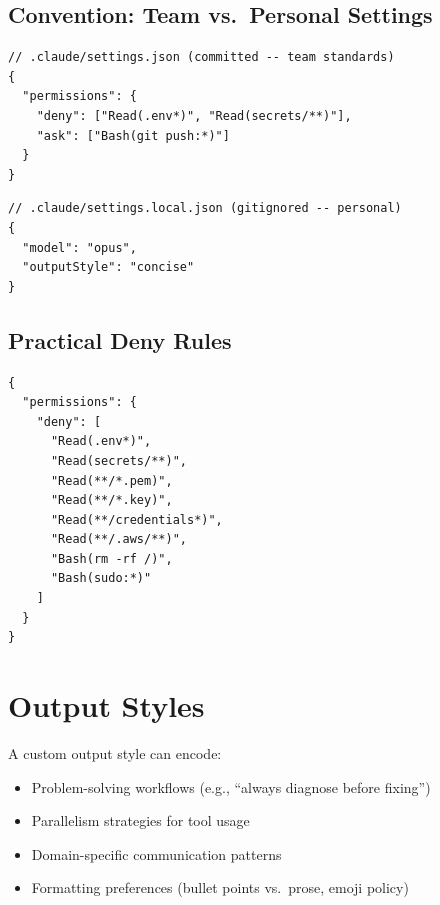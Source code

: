 \subsection{Convention: Team vs.\ Personal Settings}


\begin{verbatim}
// .claude/settings.json (committed -- team standards)
{
  "permissions": {
    "deny": ["Read(.env*)", "Read(secrets/**)"],
    "ask": ["Bash(git push:*)"]
  }
}
\end{verbatim}

\begin{verbatim}
// .claude/settings.local.json (gitignored -- personal)
{
  "model": "opus",
  "outputStyle": "concise"
}
\end{verbatim}

\subsection{Practical Deny Rules}


\begin{verbatim}
{
  "permissions": {
    "deny": [
      "Read(.env*)",
      "Read(secrets/**)",
      "Read(**/*.pem)",
      "Read(**/*.key)",
      "Read(**/credentials*)",
      "Read(**/.aws/**)",
      "Bash(rm -rf /)",
      "Bash(sudo:*)"
    ]
  }
}
\end{verbatim}

\section{Output Styles}
\label{sec:output-styles}



A custom output style can encode:
\begin{itemize}
  \item Problem-solving workflows (e.g., ``always diagnose before fixing'')
  \item Parallelism strategies for tool usage
  \item Domain-specific communication patterns
  \item Formatting preferences (bullet points vs.\ prose, emoji policy)
\end{itemize}


